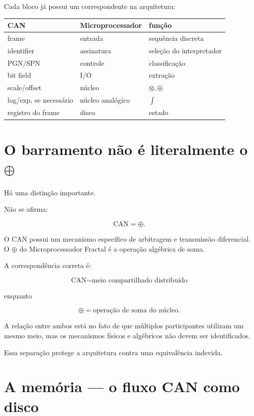 \documentclass[11pt,a4paper]{article}
\begin{document}
Cada bloco já possui um correspondente na arquitetura:

\begin{center}
\begin{tabular}{lll}
\toprule
CAN & Microprocessador & função\\
\midrule
frame & entrada & sequência discreta\\
identifier & assinatura & seleção do interpretador\\
PGN/SPN & controle & classificação\\
bit field & I/O & extração\\
scale/offset & núcleo & $\otimes,\oplus$\\
log/exp, se necessário & núcleo analógico & $\int$\\
registro do frame & disco & estado\\
\bottomrule
\end{tabular}
\end{center}


\section{O barramento não é literalmente o $\oplus$}

Há uma distinção importante.

Não se afirma:

\[
\mathrm{CAN}=\oplus.
\]

O CAN possui um mecanismo específico de arbitragem e transmissão diferencial.
O $\oplus$ do Microprocessador Fractal é a operação algébrica de soma.

A correspondência correta é:

\[
\boxed{
\text{CAN}
\sim
\text{meio compartilhado distribuído}
}
\]

enquanto

\[
\boxed{
\oplus
=
\text{operação de soma do núcleo}.
}
\]

A relação entre ambos está no fato de que múltiplos participantes utilizam um
mesmo meio, mas os mecanismos físicos e algébricos não devem ser identificados.

Essa separação protege a arquitetura contra uma equivalência indevida.


\section{A memória --- o fluxo CAN como disco}
\end{document}
